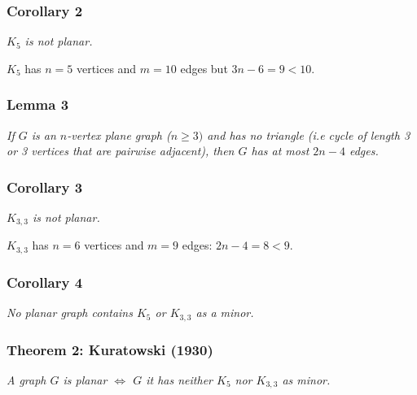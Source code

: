 \documentclass[11pt]{book}
\begin{document}
		\subsubsection{Corollary 2}
		\textit{$K_5$ is not planar.\\}
		
		$K_5$ has $n = 5$ vertices and $m = 10$ edges but $3n - 6 = 9 < 10$.
		
		
		\subsubsection{Lemma 3}
		\textit{If $G$ is an $n$-vertex plane graph ($n \geq 3)$ and has no triangle (i.e cycle of length 3 or 3 vertices that are pairwise adjacent), then $G$ has at most $2n - 4$ edges.\\}
		
		\subsubsection{Corollary 3}
		\textit{$K_{3,3}$ is not planar.\\}
		
		$K_{3,3}$ has $n = 6$ vertices and $m = 9$ edges: $2n - 4 = 8 < 9$.
		
		\subsubsection{Corollary 4}
		\textit{No planar graph contains $K_5$ or $K_{3,3}$ as a minor.}
		
		\subsubsection{Theorem 2: Kuratowski (1930)}
		\textit{A graph $G$ is planar $\iff$ $G$ it has neither $K_5$ nor $K_{3,3}$ as minor.\\}
		
\end{document}
